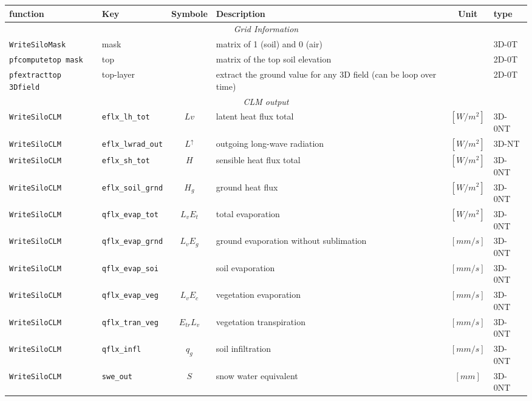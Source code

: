 \documentclass[11pt,a4paper]{report}
\begin{document}
\begin{landscape}
\begin{table}[htbp]
\centering
\begin{tabular}{llcp{7cm}cl}
\toprule
 function & Key           & Symbole & Description                                                       & Unit & type             \\
 \midrule
\multicolumn{6}{c}{\emph{Grid Information}}                                                                \\
\verb$WriteSiloMask$ & mask && matrix of 1 (soil) and 0 (air)                                            &  & 3D-0T         \\
\verb$pfcomputetop mask$ & top    && matrix of the top soil elevation                                              & & 2D-0T         \\
\verb$pfextracttop 3Dfield$ & top-layer    && extract the ground value for any 3D field (can be loop over time) & & 2D-0T         \\
\multicolumn{6}{c}{\emph{CLM output}}    \\
\verb$WriteSiloCLM$&\verb$eflx_lh_tot$     & $Lv$ & latent heat flux total & $[W/m^2]$ &    3D-0NT \\
\verb$WriteSiloCLM$&\verb$eflx_lwrad_out$   & $L^{\uparrow}$  & outgoing long-wave radiation & $[W/m^2]$ &    3D-NT \\
\verb$WriteSiloCLM$&\verb$eflx_sh_tot$   & $H $  & sensible heat flux total & $[W/m^2]$ &    3D-0NT \\
\verb$WriteSiloCLM$&\verb$eflx_soil_grnd$   & $ H_g$   & ground heat flux & $[W/m^2]$ &    3D-0NT \\
\verb$WriteSiloCLM$&\verb$qflx_evap_tot$   & $L_vE_t$   & total evaporation & $[W/m^2]$ &    3D-0NT \\
\verb$WriteSiloCLM$&\verb$qflx_evap_grnd$   &  $L_vE_g$  & ground evaporation without sublimation & $[mm/s]$ &    3D-0NT \\
\verb$WriteSiloCLM$&\verb$qflx_evap_soi$   &   & soil evaporation & $[mm/s]$ &    3D-0NT \\
\verb$WriteSiloCLM$&\verb$qflx_evap_veg$    & $L_vE_c$  & vegetation evaporation & $[mm/s]$ &    3D-0NT \\
\verb$WriteSiloCLM$&\verb$qflx_tran_veg$  & $ E_{tr}L_v$  & vegetation transpiration & $[mm/s]$ &    3D-0NT \\
\verb$WriteSiloCLM$&\verb$qflx_infl$   & $q_g$   & soil infiltration & $[mm/s]$ &    3D-0NT \\
\verb$WriteSiloCLM$&\verb$swe_out$  & $S $   & snow water equivalent & $[mm]$ &    3D-0NT \\

\end{tabular}
\end{table}
\end{landscape}
\end{document}
